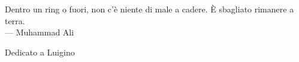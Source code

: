 \cleardoublepage
{}
\thispagestyle{empty}

\vspace*{3cm}

\begin{center}
         Dentro un ring o fuori, non c'è niente di male a cadere. È sbagliato rimanere a terra. \\ \medskip
    --- Muhammad Ali
\end{center}

\medskip

\begin{center}
    Dedicato a Luigino
\end{center}
